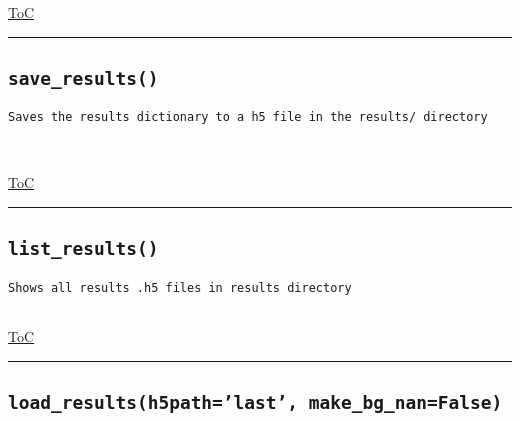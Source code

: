 \documentclass{article}
\begin{document}
\begin{flushright}

\hyperref[toc]{ToC}

\end{flushright}



\vspace{5mm}

\hrule

\subsection*{\texttt{save\_results()}}

\begin{lstlisting}[language=docstring]
Saves the results dictionary to a h5 file in the results/ directory

    
\end{lstlisting}

\begin{flushright}

\hyperref[toc]{ToC}

\end{flushright}



\vspace{5mm}

\hrule

\subsection*{\texttt{list\_results()}}

\begin{lstlisting}[language=docstring]
Shows all results .h5 files in results directory
    
\end{lstlisting}

\begin{flushright}

\hyperref[toc]{ToC}

\end{flushright}



\vspace{5mm}

\hrule

\subsection*{\texttt{load\_results(h5path='last', make\_bg\_nan=False)}}
\end{document}
